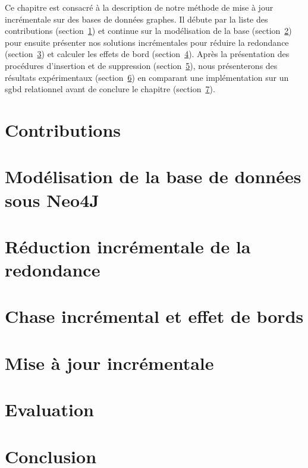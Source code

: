 Ce chapitre est consacré à la description de notre méthode de mise à jour incrémentale sur des bases de données graphes.
Il débute par la liste des contributions (section~\ref{sec:update:contrib}) et continue sur la modélisation de la base (section~\ref{sec:update:db}) pour ensuite présenter nos solutions incrémentales pour réduire la redondance (section~\ref{sec:update:simplify}) et calculer les effets de bord (section~\ref{sec:update:chase}).
Après la présentation des procédures d'insertion et de suppression (section~\ref{sec:update:update}), nous présenterons des résultats expérimentaux (section~\ref{sec:update:evaluation}) en comparant une implémentation sur un \gls{sgbd} relationnel avant de conclure le chapitre (section~\ref{sec:update:conclusion}).

\section{Contributions}
\label{sec:update:contrib}


\section{Modélisation de la base de données sous Neo4J}
\label{sec:update:db}


\section{Réduction incrémentale de la redondance}
\label{sec:update:simplify}


\section{Chase incrémental et effet de bords}
\label{sec:update:chase}


\section{Mise à jour incrémentale}
\label{sec:update:update}


\section{Evaluation}
\label{sec:update:evaluation}


\section{Conclusion}
\label{sec:update:conclusion}

